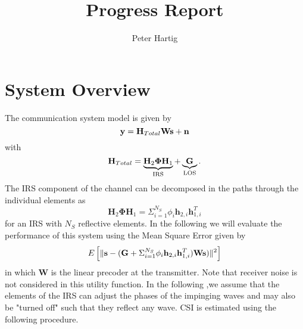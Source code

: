 \documentclass[12pt,a4paper]{report}
\title{Progress Report}
\author{Peter Hartig}
\begin{document}
\maketitle
\tableofcontents
\section{System Overview}
The communication system model is given by 
\begin{equation}
\mathbf{y} = \mathbf{H}_{Total} \mathbf{W} \mathbf{s}  + \mathbf{n}
\end{equation}
with 
	\begin{equation*}
	\mathbf{H}_{Total} = \underbrace{\mathbf{H}_{2}\boldsymbol{\Phi}\mathbf{H}_{1}}_{\text{IRS}} + \underbrace{\mathbf{G}}_{\text{LOS}}.
	\end{equation*}
	The IRS component of the channel can be decomposed in the paths through the individual elements as
	\begin{equation}
	\mathbf{H}_{2}\boldsymbol{\Phi}\mathbf{H}_{1}= 
	\Sigma_{i=1}^{N_S} \phi_i \mathbf{h}_{2,i}\mathbf{h}^T_{1,i}
	\end{equation}
	for an IRS with $N_S$ reflective elements. 
In the following we will evaluate the performance of this system using the Mean Square Error given by 
\begin{equation}
E\left[\|  \mathbf{s} - (\mathbf{G} + \Sigma_{i=1}^{N_S} \phi_i \mathbf{h}_{2,i}\mathbf{h}^T_{1,i})\mathbf{W}\mathbf{s}) \|^2 \right]
\end{equation}
in which $\mathbf{W}$ is the linear precoder at the transmitter. Note that receiver noise is not considered in this utility function. 
In the following ,we assume that the elements of the IRS can adjust the phases of the impinging waves and may also be "turned off" such that they reflect any wave.
CSI is estimated using the following procedure.
\end{document}
